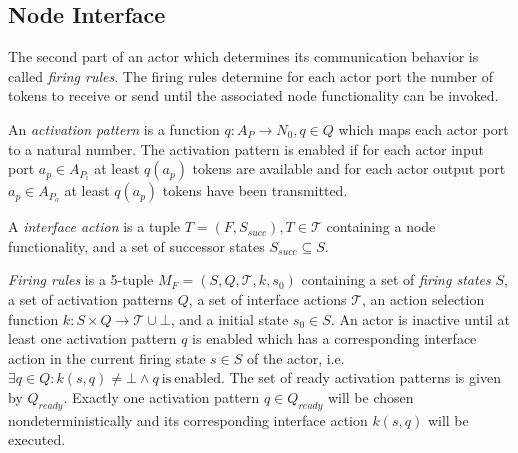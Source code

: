 \subsection{Node Interface}\label{node-interface}

The second part of an actor which determines its communication
behavior is called \emph{firing rules}. The firing rules
determine for each actor port the number of tokens to receive or send
until the associated node functionality can be invoked.


\begin{definition}\label{activation-pattern}
An \emph{activation pattern} is a function $q: A_{P} \to N_0, q \in Q$
which maps each actor port to a natural number.
The activation pattern is enabled if for each actor input port
$a_{p} \in A_{P_{i}}$ at least $q(a_{p})$ tokens are available
and for each actor output port
$a_{p} \in A_{P_{o}}$ at least $q(a_{p})$ tokens have been
transmitted.
\end{definition}

\begin{definition}\label{interface-action}
A \emph{interface action} is a tuple $T = (F,S_{succ}), T \in \mathcal{T}$ containing
a node functionality, and a set of successor states $S_{succ} \subseteq S$.
\end{definition}

\begin{definition}\label{firing-rules}
\emph{Firing rules} is a 5-tuple $M_{F} = (S, Q, \mathcal{T}, k, s_0)$ containing
a set of \emph{firing states} $S$, a set of activation patterns $Q$,
a set of interface actions $\mathcal{T}$, an action selection function
$k: S \times Q \to \mathcal{T} \cup \bot$,
and a initial state $s_0 \in S$. An actor is inactive until at least
one activation pattern $q$ is enabled which has a corresponding
interface action in the current firing state $s \in S$ of the actor,
i.e. $\exists{q \in Q}: k(s,q) \ne \bot \wedge q\ \mathrm{is\ enabled}$.
The set of ready activation patterns is given by $Q_{ready}$.
Exactly one activation pattern $q \in Q_{ready}$ will be
chosen nondeterministically and its corresponding interface action
$k(s,q)$ will be executed.
\end{definition}

